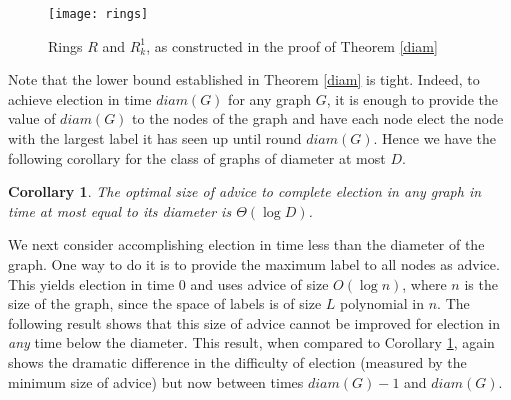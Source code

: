 \documentclass[11pt]{article}
\newtheorem{corollary}{Corollary}[section]
\newcommand{\diam}[1]{\ensuremath{{diam}(#1)}}
\begin{document}
\begin{figure}[!ht]
\begin{center}
\texttt{[image: rings]}
\end{center}
\caption{Rings $R$ and $R^1_k$, as constructed in the proof of Theorem \ref{diam}}
\label{rings}
\end{figure}



Note that the lower bound established in Theorem \ref{diam} is tight. Indeed, to achieve election in time $\diam{G}$ for any graph $G$, it is enough to provide
the value of $\diam{G}$ to the nodes of the graph and have each node elect the node with the largest label it has seen up until round  $\diam{G}$.
Hence we have the following corollary for the class of graphs of diameter at most $D$.

\begin{corollary}\label{cor1}
The optimal size of advice to complete election in any graph in time at most equal to its diameter is $\Theta(\log D)$.
\end{corollary}

We next consider accomplishing election in time less than the diameter of the graph. One way to do it is to provide the maximum label to all nodes as advice. This yields 
election in time 0 and uses advice of size $O(\log n)$, where $n$ is the size of the graph,  since the space of labels is of size $L$ polynomial in $n$.
The following result shows that this size of advice cannot be improved for election in {\em any} time below the diameter. This result, when compared to Corollary
\ref{cor1}, again shows the dramatic difference in the difficulty of election (measured by the minimum size of advice) but now between times $\diam{G}-1$ and $\diam{G}$. 
\end{document}
